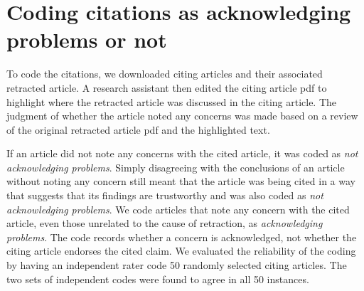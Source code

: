 \documentclass[11pt,letterpaper]{article}
\begin{document}
\section{Coding citations as acknowledging problems or not}
\label{app:coding}
To code the citations, we downloaded citing articles and their associated retracted article. A research assistant then edited the citing article pdf to highlight where the retracted article was discussed in the citing article. The judgment of whether the article noted any concerns was made based on a review of the original retracted article pdf and the highlighted text.

If an article did not note any concerns with the cited article, it was coded as \textit{not acknowledging problems}. Simply disagreeing with the conclusions of an article without noting any concern still meant that the article was being cited in a way that suggests that its findings are trustworthy and was also coded as \textit{not acknowledging problems}. We code articles that note any concern with the cited article, even those unrelated to the cause of retraction, as \textit{acknowledging problems}. The code records whether a concern is acknowledged, not whether the citing article endorses the cited claim. We evaluated the reliability of the coding by having an independent rater code 50 randomly selected citing articles. The two sets of independent codes were found to agree in all 50 instances.
\end{document}

